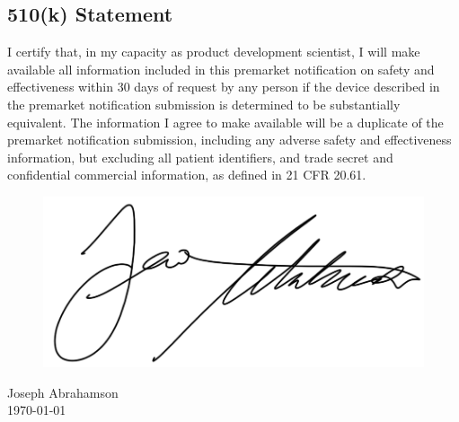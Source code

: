 \newpage
\subsection{510(k) Statement}

I certify that, in my capacity as product development scientist, I
will make available all information included in this premarket
notification on safety and effectiveness within 30 days of request by
any person if the device described in the premarket notification
submission is determined to be substantially equivalent. The
information I agree to make available will be a duplicate of the
premarket notification submission, including any adverse safety and
effectiveness information, but excluding all patient identifiers, and
trade secret and confidential commercial information, as defined in 21
CFR 20.61.

\begin{figure}[H]
  \includegraphics[width=0.35\linewidth]{imgs/ja-sig}
\end{figure}

\noindent Joseph Abrahamson \\
\today


